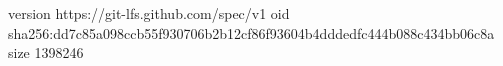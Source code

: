 version https://git-lfs.github.com/spec/v1
oid sha256:dd7c85a098ccb55f930706b2b12cf86f93604b4dddedfc444b088c434bb06c8a
size 1398246
